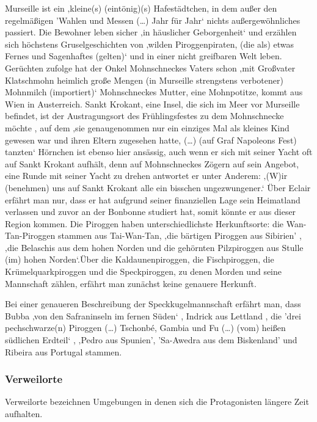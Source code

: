 Murseille ist ein ‚kleine(s) (eintönig)(s) Hafestädtchen, in dem außer den regelmäßigen 'Wahlen und Messen (…) Jahr für Jahr‘\cite[S. 10]{pir} nichts außergewöhnliches passiert. Die Bewohner leben sicher ‚in häuslicher Geborgenheit‘ und erzählen sich höchstens Gruselgeschichten von ‚wilden Piroggenpiraten, (die als) etwas Fernes und Sagenhaftes (gelten)‘ \cite[S.10]{pir} und in einer nicht greifbaren Welt leben. Gerüchten zufolge hat der Onkel Mohnschneckes Vaters schon ‚mit Großvater Klatschmohn heimlich große Mengen (in Murseille strengstens verbotener) Mohnmilch (importiert)‘\cite[S.14]{pir} Mohnschneckes Mutter, eine Mohnpotitze, kommt aus Wien in Austerreich. \cite[S. 13]{pir} Sankt Krokant, eine Insel, die sich im Meer vor Murseille befindet, ist der Austragungsort des Frühlingsfestes zu dem Mohnschnecke möchte \cite[S.17]{pir}, auf dem ‚sie genaugenommen nur ein einziges Mal als kleines Kind gewesen war und ihren Eltern zugesehen hatte, (…) (auf Graf Napoleons Fest) tanzten‘ \cite[S.521]{pir} 
Hörnchen ist ebenso hier ansässig, auch wenn er sich mit seiner Yacht oft auf Sankt Krokant aufhält, denn auf Mohnschneckes Zögern auf sein Angebot, eine Runde mit seiner Yacht zu drehen antwortet er unter Anderem: ‚(W)ir (benehmen) uns auf Sankt Krokant alle ein bisschen ungezwungener.‘\cite[S.25]{pir} 
Über Eclair erfährt man nur, dass er hat aufgrund seiner finanziellen Lage sein Heimatland verlassen und zuvor an der Bonbonne studiert hat, somit könnte er aus dieser Region kommen. \cite[S.15f]{pir}
Die Piroggen haben unterschiedlichste Herkunftsorte: die Wan-Tan-Piroggen stammen aus Tai-Wan-Tan, \cite[S.8]{pir}
 ‚die bärtigen Piroggen aus Sibirien' \cite[S.8]{pir}, ‚die Belaschis aus dem hohen Norden \cite[S.9]{pir} und die gehörnten Pilzpiroggen aus Stulle (im) hohen Norden‘\cite[S.9]{pir}.Über die Kaldaunenpiroggen, die Fischpiroggen, die Krümelquarkpiroggen und die Speckpiroggen, zu denen Morden und seine Mannschaft zählen, erfährt man zunächst keine genauere Herkunft. \cite[S.9f]{pir}

Bei einer genaueren Beschreibung der Speckkugelmannschaft erfährt man, dass Bubba ‚von den Safraninseln im fernen Süden‘ \cite[S.46]{pir}, Indrick aus Lettland \cite[S.46f]{pir}, die 'drei pechschwarze(n) Piroggen (…) Tschonbé, Gambia und Fu (…) (vom) heißen südlichen Erdteil‘ \cite[S.47]{pir}, ‚Pedro aus Spunien'\cite[S.47]{pir}, 'Sa-Awedra aus dem Biskenland' \cite[S.47]{pir} und Ribeira aus Portugal \cite[S.47]{pir} stammen.


\subsubsection{Verweilorte}
Verweilorte bezeichnen Umgebungen in denen sich die Protagonisten längere Zeit aufhalten.

